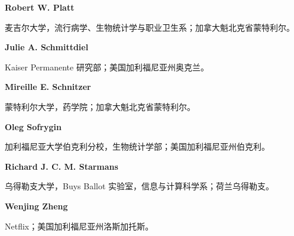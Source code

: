 \noindent\textbf{Robert W. Platt}\par
麦吉尔大学，流行病学、生物统计学与职业卫生系；加拿大魁北克省蒙特利尔。

\noindent\textbf{Julie A. Schmittdiel}\par
Kaiser Permanente 研究部；美国加利福尼亚州奥克兰。

\noindent\textbf{Mireille E. Schnitzer}\par
蒙特利尔大学，药学院；加拿大魁北克省蒙特利尔。

\noindent\textbf{Oleg Sofrygin}\par
加利福尼亚大学伯克利分校，生物统计学部；美国加利福尼亚州伯克利。

\noindent\textbf{Richard J. C. M. Starmans}\par
乌得勒支大学，Buys Ballot 实验室，信息与计算科学系；荷兰乌得勒支。

\noindent\textbf{Wenjing Zheng}\par
Netflix；美国加利福尼亚州洛斯加托斯。

